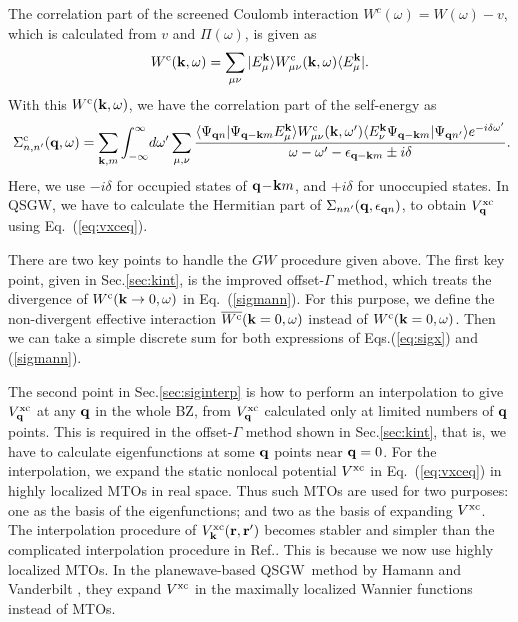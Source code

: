 \documentclass[a4paper,10pt,fleqn]{article}
\def\QSGW{QS{GW}}
\def\Psiqn{{\Psi_{{\bf q}n}}}
\def\vxc{V^{\rm xc}}
\def\Psiqkm{{\Psi_{{\bf q}-{\bf k}m}}}
\def\Psiqnp{{\Psi_{{\bf q}n'}}}
\def\Psiqn{{\Psi_{{\bf q}n}}}
\newcommand{\bfq}{{\bf q}}
\newcommand{\bfk}{{\bf k}}
\newcommand{\bfr}{{\bf r}}
\newcommand{\req}[1]{\mbox{Eq.~(\ref{#1})}}
\begin{document}
The correlation part of the screened Coulomb interaction $W^c(\omega)=W(\omega)-v$, 
which is calculated from $v$ and $\Pi(\omega)$, is given as
\begin{eqnarray}
W^{\rm c}(\bfk,\omega)=\sum_{\mu\nu} | E^{\bfk}_\mu \rangle {W^{\rm c}_{\mu\nu}(\bfk,\omega)} 
\langle E^{\bfk}_\mu |.
\end{eqnarray}
With this $W^{\rm c}(\bfk,\omega)$, we have the correlation part of the self-energy  as
\begin{eqnarray}\
\Sigma^{\rm c}_{n,n'}(\bfq,\omega)= \sum_{\bfk,m} \int_{-\infty}^\infty  \!d \omega' \sum_{\mu,\nu} 
\frac{\langle\Psiqn|\Psiqkm E^{\bfk}_\mu \rangle 
W^{\rm c}_{\mu\nu}(\bfk,\omega')\langle E^{\bfk}_\nu \Psiqkm
|\Psiqnp\rangle e^{-i \delta \omega'}}
{\omega-\omega'-\epsilon_{\bfq-\bfk m}\pm i \delta}.
\label{sigmann}
\end{eqnarray}
Here, we use $-i \delta$ for occupied states of
${\bfq\!-\!\bfk m}$, and $+i \delta$ for unoccupied states.
In \QSGW, we have to calculate the Hermitian part of $\Sigma_{nn'}(\bfq,\epsilon_{\bfq n})$, 
to obtain $\vxc_\bfq$ using \req{eq:vxceq}.

There are two key points to handle the $GW$ procedure given above.
The first key point, given in Sec.\ref{sec:kint},
is the improved offset-$\Gamma$ method, which treats
the divergence of $W^{\rm c}(\bfk \to 0,\omega)$ in \req{sigmann}. 
For this purpose, we define the non-divergent 
effective interaction $\overline{W^{\rm c}}(\bfk=0,\omega)$ instead of
${W^{\rm c}}(\bfk=0,\omega)$.
Then we can take a simple discrete sum for both expressions of
Eqs.(\ref{eq:sigx}) and (\ref{sigmann}).

The second point in Sec.\ref{sec:siginterp} is
how to perform
an interpolation to give $\vxc_\bfq$ at any $\bfq$ in the whole BZ,
from $\vxc_\bfq$ calculated only at limited numbers of $\bfq$ points.
This is required in the offset-$\Gamma$ method shown in Sec.\ref{sec:kint},
that is, we have to calculate eigenfunctions at some $\bfq$ points near $\bfq=0$.
For the interpolation, we expand the static
nonlocal potential $\vxc$ in \req{eq:vxceq} in highly localized
MTOs in real space. Thus such MTOs are used for two purposes:
one as the basis of the eigenfunctions; and two as the basis of 
expanding $\vxc$. The interpolation procedure of $\vxc_\bfk(\bfr,\bfr')$
becomes stabler and simpler than the
complicated interpolation procedure in 
Ref.\cite{kotani_quasiparticle_2007}.
This is because we now use highly localized MTOs.
In the planewave-based \QSGW\ method by Hamann and Vanderbilt \cite{hamann09}, 
they expand $\vxc$ in the maximally localized Wannier functions instead of MTOs.
\end{document}
